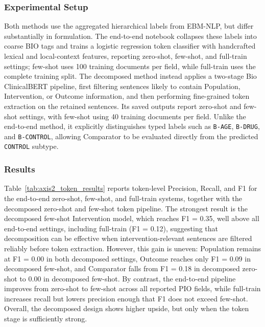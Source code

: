 \documentclass{article}
\begin{document}
\subsubsection{Experimental Setup}

Both methods use the aggregated hierarchical labels from EBM-NLP, but differ substantially in formulation. The end-to-end notebook collapses these labels into coarse BIO tags and trains a logistic regression token classifier with handcrafted lexical and local-context features, reporting zero-shot, few-shot, and full-train settings; few-shot uses 100 training documents per field, while full-train uses the complete training split. The decomposed method instead applies a two-stage Bio ClinicalBERT pipeline, first filtering sentences likely to contain Population, Intervention, or Outcome information, and then performing fine-grained token extraction on the retained sentences. Its saved outputs report zero-shot and few-shot settings, with few-shot using 40 training documents per field. Unlike the end-to-end method, it explicitly distinguishes typed labels such as \texttt{B-AGE}, \texttt{B-DRUG}, and \texttt{B-CONTROL}, allowing Comparator to be evaluated directly from the predicted \texttt{CONTROL} subtype.


\subsubsection{Results}

Table~\ref{tab:axis2_token_results} reports token-level Precision, Recall, and F1 for the end-to-end zero-shot, few-shot, and full-train systems, together with the decomposed zero-shot and few-shot token pipeline. The strongest result is the decomposed few-shot Intervention model, which reaches F1 = 0.35, well above all end-to-end settings, including full-train (F1 = 0.12), suggesting that decomposition can be effective when intervention-relevant sentences are filtered reliably before token extraction. However, this gain is uneven: Population remains at F1 = 0.00 in both decomposed settings, Outcome reaches only F1 = 0.09 in decomposed few-shot, and Comparator falls from F1 = 0.18 in decomposed zero-shot to 0.00 in decomposed few-shot. By contrast, the end-to-end pipeline improves from zero-shot to few-shot across all reported PIO fields, while full-train increases recall but lowers precision enough that F1 does not exceed few-shot. Overall, the decomposed design shows higher upside, but only when the token stage is sufficiently strong.
\end{document}
